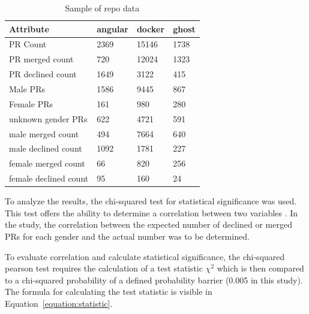 \begin{table}[!t]
    \renewcommand{\arraystretch}{1.3}
    \caption{Sample of repo data}
    \label{table:sampledata}
    \centering

    \begin{tabular} { l | l | l | l  }
        \textbf{Attribute}             &     \textbf{angular}        &    \textbf{docker}    &    \textbf{ghost}    \\ \hline

        PR Count        &2369    &    15146&1738 \\
        PR merged count     &720    &    12024&1323 \\
        PR declined count     &1649    &    3122 &415  \\
        Male PRs        &1586    &    9445 &867  \\
        Female PRs        &161    &    980  &280  \\
        unknown gender PRs    &622    &    4721 &591  \\
        male merged count      &494    &    7664 &640  \\
        male declined count    &1092    &    1781 &227  \\
        female merged count    &66    &    820  &256  \\
        female declined count    &95    &    160  &24   \\


    \end{tabular}
\end{table}

To analyze the results, the chi-squared test for statistical significance was used. This test offers the ability to determine a correlation between two variables  \cite[p.102ff.]{chi2016springer}. In the study, the correlation between the expected number of declined or merged \ac{PR}s for each gender and the actual number was to be determined.

To evaluate correlation and calculate statistical significance, the chi-squared pearson test requires the calculation of a test statistic $ \chi^2 $ which is then compared to a chi-squared probability of a defined probability barrier (0.005 in this study). The formula for calculating the test statistic is visible in Equation~\ref{equation:statistic}.

